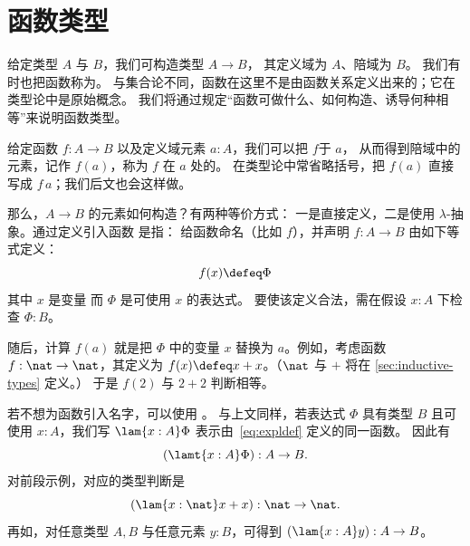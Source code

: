 \section{函数类型}
\label{sec:function-types}

%
%
给定类型 $A$ 与 $B$，我们可构造类型 $A \to B$，
%
%
%
其定义域为 $A$、陪域为 $B$。
我们有时也把函数称为。
%
%
%
%
%
与集合论不同，函数在这里不是由函数关系定义出来的；它在类型论中是原始概念。
我们将通过规定“函数可做什么、如何构造、诱导何种相等”来说明函数类型。

给定函数 $f : A \to B$ 以及定义域元素 $a : A$，我们可以把 $f$于 $a$，
%
%
从而得到陪域中的元素，记作 $f(a)$，称为 $f$ 在 $a$ 处的。
%
在类型论中常省略括号，把 $f(a)$ 直接写成 $f\,a$；我们后文也会这样做。

那么，$A \to B$ 的元素如何构造？有两种等价方式：
一是直接定义，二是使用
$\lambda$-抽象。通过定义引入函数
%
是指：
给函数命名（比如 $f$），并声明
$f : A \to B$ 由如下等式定义：
\begin{equation}
  \label{eq:expldef}
  f(x) \defeq \Phi
\end{equation}
其中 $x$ 是变量
%
而 $\Phi$ 是可使用 $x$ 的表达式。
要使该定义合法，需在假设 $x:A$ 下检查 $\Phi : B$。

随后，计算 $f(a)$ 就是把 $\Phi$ 中的变量 $x$ 替换为
$a$。例如，考虑函数 $f : \nat \to \nat$，其定义为 $f(x) \defeq x+x$。（$\nat$ 与 $+$ 将在 \cref{sec:inductive-types} 定义。）
于是 $f(2)$ 与 $2+2$ 判断相等。

若不想为函数引入名字，可以使用
。
%
%
%
与上文同样，若表达式 $\Phi$ 具有类型 $B$ 且可使用 $x:A$，我们写 $\lam{x:A} \Phi$ 表示由~\eqref{eq:expldef} 定义的同一函数。
因此有
\[ (\lamt{x:A}\Phi) : A \to B. \]
对前段示例，对应的类型判断是
\[ (\lam{x:\nat}x+x) : \nat \to \nat. \]
再如，对任意类型 $A,B$ 与任意元素 $y:B$，可得到
%
%
$(\lam{x:A} y): A\to B$。

